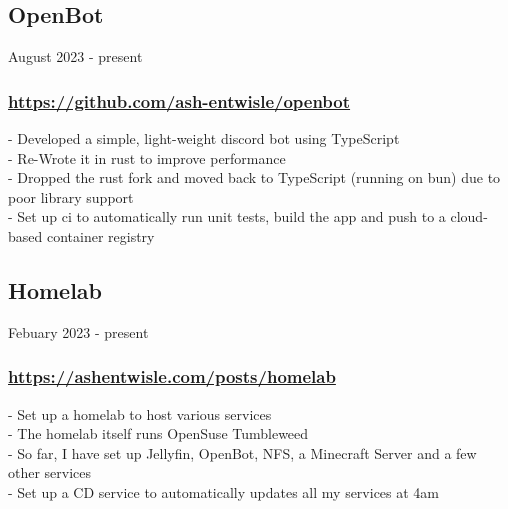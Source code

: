 \subsection{OpenBot} August 2023 - present \\
\subsubsection{\href{https://github.com/ash-entwisle/openbot}{https://github.com/ash-entwisle/openbot}}
-\:  Developed a simple, light-weight discord bot using TypeScript \\
-\:  Re-Wrote it in rust to improve performance \\
-\:  Dropped the rust fork and moved back    to TypeScript (running on bun) due to poor library support \\
-\:  Set up ci to automatically run unit tests, build the app and push to a cloud-based container registry \\


\subsection{Homelab} Febuary 2023 - present \\
\subsubsection{\href{https://ashentwisle.com/posts/homelab-go-brrr}{https://ashentwisle.com/posts/homelab}}
-\:  Set up a homelab to host various services \\
-\:  The homelab itself runs OpenSuse Tumbleweed \\
-\:  So far, I have set up Jellyfin, OpenBot, NFS, a Minecraft Server and a few other services \\
-\:  Set up a CD service to automatically updates all my services at 4am \\

